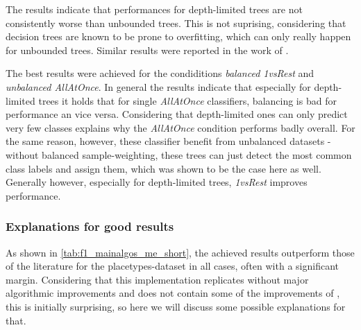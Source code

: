 The results indicate that performances for depth-limited trees are not consistently worse than unbounded trees. This is not suprising, considering that decision trees are known to be prone to overfitting, which can only really happen for unbounded trees. Similar results were reported in the work of \textcite{Ager2018}.

The best results were achieved for the condiditions \textit{balanced 1vsRest} and \textit{unbalanced AllAtOnce}. In general the results indicate that especially for depth-limited trees it holds that for single \textit{AllAtOnce} classifiers, balancing is bad for performance an vice versa. Considering that depth-limited ones can only predict very few classes explains why the \textit{AllAtOnce} condition performs badly overall. For the same reason, however, these classifier benefit from unbalanced datasets - without balanced sample-weighting, these trees can just detect the most common class labels and assign them, which was shown to be the case here as well. Generally however, especially for depth-limited trees, \textit{1vsRest} improves performance.


\subsubsection*{Explanations for good results}


As shown in \autoref{tab:f1_mainalgos_me_short}, the achieved results outperform those of the literature for the placetypes-dataset in all cases, often with a significant margin. Considering that this implementation replicates \cite{Derrac2015} without major algorithmic improvements and does not contain some of the improvements of \cite{Ager2018, Alshaikh2020}, this is initially surprising, so here we will discuss some possible explanations for that.

